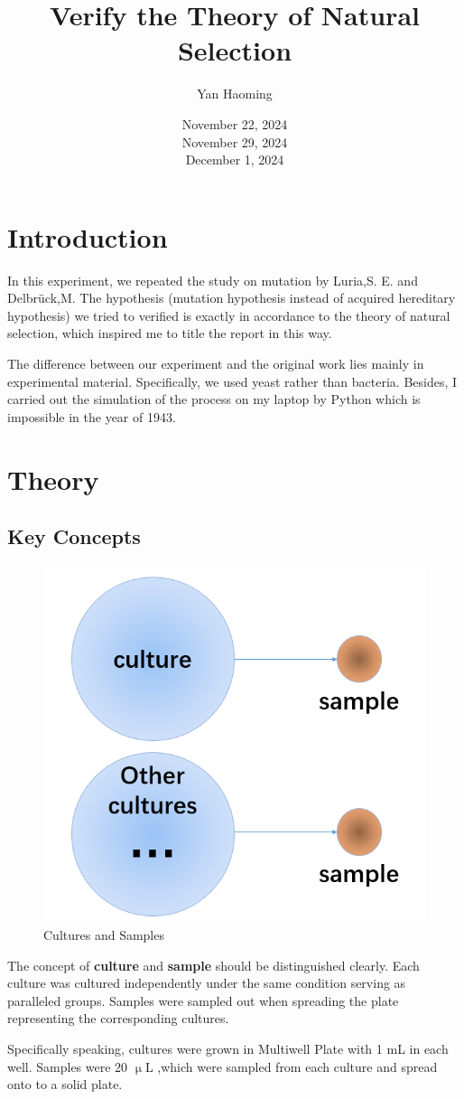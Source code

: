 \documentclass[UTF-8]{article}
\title{Verify the Theory of Natural Selection}
\author{Yan Haoming}
\date{November 22, 2024\\November 29, 2024\\December 1, 2024}
\begin{document}
\maketitle
\section{Introduction}
In this experiment, we repeated the study on mutation by Luria,S. E. and Delbrück,M.\cite{paper}
The hypothesis (mutation hypothesis instead of acquired hereditary hypothesis) we tried to verified is exactly in accordance to the theory of natural selection, which inspired me to title the report in this way.

The difference between our experiment and the original work lies mainly in experimental material.
Specifically, we used yeast rather than bacteria.
Besides, I carried out the simulation of the process on my laptop by Python which is impossible in the year of 1943.
\section{Theory}
\subsection{Key Concepts}
\begin{figure}[h]
    \centering
    \includegraphics[width=0.5\linewidth]{../Figures/concept of culture and sample.png}
    \caption{Cultures and Samples}
    \label{Cultures and Samples}
\end{figure}
The concept of \textbf{culture} and \textbf{sample} should be distinguished clearly.
Each culture was cultured independently under the same condition serving as paralleled groups.
Samples were sampled out when spreading the plate representing the corresponding cultures.

Specifically speaking, cultures were grown in Multiwell Plate with 1 mL in each well.
Samples were 20 $\upmu$L ,which were sampled from each culture and spread onto to a solid plate.
\end{document}
